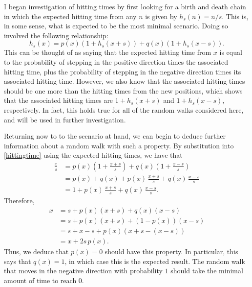 I began investigation of hitting times by first looking for a birth and death chain in which the
expected hitting time from any $n$ is given by $h_s(n) = n/s$. This is, in some sense, what is expected
to be the most minimal scenario. Doing so involved the following relationship:
\begin{equation}\label{hittingtime}
    h_s(x) = p(x)(1+h_s(x+s)) + q(x)(1+h_s(x-s)).
\end{equation}
This can be thought of as saying that the expected hitting time from $x$ is equal to the probability of
stepping in the positive direction times the associated hitting time, plus the probability of stepping
in the negative direction times its associated hitting time. However, we also know that the associated
hitting times should be one more than the hitting times from the new positions, which shows that the
associated hitting times are $1+h_s(x+s)$ and $1+h_s(x-s)$, respectively. In fact, this holds true for
all of the random walks considered here, and will be used in further investigation.

Returning now to to the scenario at hand, we can begin to deduce further information about a random walk
with such a property. By substitution into \eqref{hittingtime} using the expected hitting times, we
have that
\begin{align*}
    \frac{x}{s} &= p(x)\left(1 + \frac{x+s}{s}\right) + q(x)\left(1 + \frac{x-s}{s}\right)\\
                &= p(x) + q(x) + p(x)\, \frac{x+s}{s} + q(x) \, \frac{x-s}{s} \\
                &= 1 + p(x)\, \frac{x+s}{s} + q(x) \, \frac{x-s}{s}.
\end{align*}
Therefore,
\begin{align*}
    x &= s + p(x)(x+s) + q(x)(x-s) \\
      &= s + p(x)(x+s) + (1-p(x))(x-s) \\
      &= s + x - s + p(x)(x + s - (x - s)) \\
      &= x + 2s\, p(x).
\end{align*}
Thus, we deduce that $p(x) = 0$ should have this property. In particular, this says that $q(x) = 1$, in
which case this is the expected result. The random walk that moves in the negative direction with
probability $1$ should take the minimal amount of time to reach $0$.

